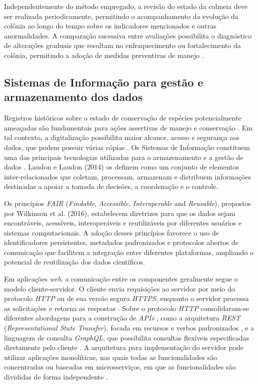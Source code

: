 \documentclass[12pt]{unisenaiclass}
\begin{document}
Independentemente do método empregado, a revisão do estado da colmeia deve ser realizada periodicamente, permitindo o acompanhamento da evolução da colônia ao longo do tempo sobre os indicadores mencionados e outras anormalidades. A comparação sucessiva entre avaliações possibilita o diagnóstico de alterações graduais que resultam no enfraquecimento ou fortalecimento da colônia, permitindo a adoção de medidas preventivas de manejo \cite{witterconservacao2014,senarmeliponicultura2024}.

\subsection{Sistemas de Informação para gestão e armazenamento dos dados}

Registros históricos sobre o estado de conservação de espécies potencialmente ameaçadas são fundamentais para ações assertivas de manejo e conservação \cite{rodriguesiucn2006,macesystem2008,parrextinction2009,rosabutterflies2022}. Em tal contexto, a digitalização possibilita maior alcance, acesso e segurança aos dados, que podem possuir várias cópias \cite{daltonhistory2003,pakniahistory2015,schilthuizespecimens2015,meinekecollections2018,cobbbiodiversity2019,rosabutterflies2022}. Os Sistemas de Informação constituem uma das principais tecnologias utilizadas para o armazenamento e a gestão de dados \cite{rodriguesgestao2024}. Laudon e Laudon (2014) os definem como um conjunto de elementos inter-relacionados que coletam, processam, armazenam e distribuem informações destinadas a apoiar a tomada de decisões, a coordenação e o controle.

Os princípios \textit{FAIR} (\textit{Findable}, \textit{Accessible}, \textit{Interoperable} and \textit{Reusable}), propostos por Wilkinson et al. (2016), estabelecem diretrizes para que os dados sejam encontráveis, acessíveis, interoperáveis e reutilizáveis por diferentes usuários e sistemas computacionais. A adoção desses princípios favorece o uso de identificadores persistentes, metadados padronizados e protocolos abertos de comunicação que facilitem a integração entre diferentes plataformas, ampliando o potencial de reutilização dos dados científicos.

Em aplicações \textit{web}, a comunicação entre os componentes geralmente segue o modelo cliente-servidor. O cliente envia requisições ao servidor por meio do protocolo \textit{HTTP} ou de sua versão segura \textit{HTTPS}, enquanto o servidor processa as solicitações e retorna as respostas \cite{oluwatosserver2014}. Sobre o protocolo \textit{HTTP} consolidaram-se diferentes abordagens para a construção de \textit{APIs} \cite{richardsonrestful2013}, como a arquitetura \textit{REST} (\textit{Representational State Transfer}), focada em recursos e verbos padronizados \cite{fieldingnetwork2000}, e a linguagem de consulta \textit{GraphQL}, que possibilita consultas flexíveis especificadas diretamente pelo cliente \cite{hartiggraphql2018}. A arquitetura para implementação do servidor pode utilizar aplicações monolíticas, nas quais todas as funcionalidades são concentradas ou baseadas em microsserviços, em que as funcionalidades são divididas de forma independente \cite{richardsarchitecture2015}.
\end{document}
